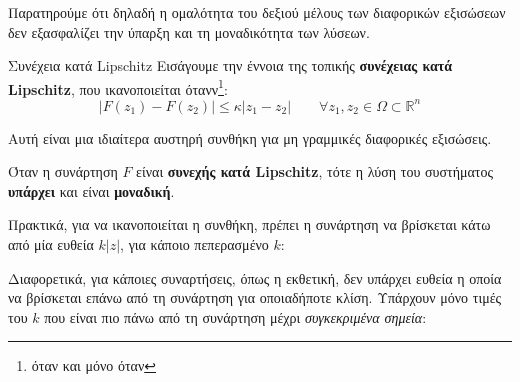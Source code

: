 \documentclass[11pt,a4paper,notitlepage,fleqn]{article}
\begin{document}
Παρατηρούμε ότι δηλαδή η ομαλότητα του δεξιού μέλους των διαφορικών εξισώσεων δεν εξασφαλίζει
την ύπαρξη και τη μοναδικότητα των λύσεων.

\begin{theorem}{Συνέχεια κατά Lipschitz}{}
	Εισάγουμε την έννοια της τοπικής \textbf{συνέχειας κατά Lipschitz}, που ικανοποιείται ότανν\footnote{όταν και μόνο όταν}:
	\[
	\left|
	F(z_1) - F(z_2)
	\right|
	\leq \kappa |z_1-z_2|\qquad \forall z_1,z_2 \in \Omega \subset \mathbb R^n
	\]
	
	Αυτή είναι μια ιδιαίτερα αυστηρή συνθήκη για μη γραμμικές διαφορικές εξισώσεις.
	\tcblower
	
	Όταν η συνάρτηση \(  F \) είναι \textbf{συνεχής κατά Lipschitz}, τότε η λύση του συστήματος \textbf{υπάρχει} και
	είναι \textbf{μοναδική}.
\end{theorem}

Πρακτικά, για να ικανοποιείται η συνθήκη, πρέπει η συνάρτηση να βρίσκεται κάτω από μία ευθεία \( k|z| \), για κάποιο
πεπερασμένο \( k \):


Διαφορετικά, για κάποιες συναρτήσεις, όπως η εκθετική, δεν υπάρχει ευθεία η οποία να βρίσκεται
επάνω από τη συνάρτηση για οποιαδήποτε κλίση. Υπάρχουν μόνο τιμές του \( k \) που είναι
πιο πάνω από τη συνάρτηση μέχρι \textit{συγκεκριμένα σημεία}:

\end{document}

